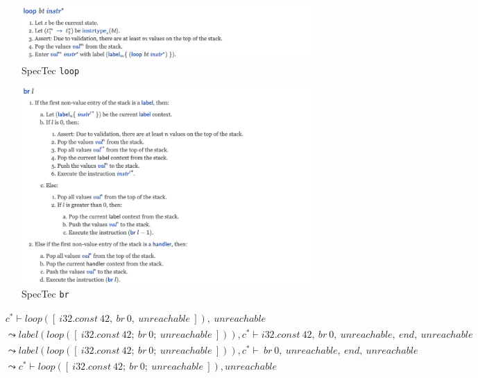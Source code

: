 \begin{figure}[h!]
    \centerline{\includegraphics[width=15cm]{fig/spectec-loop}}
    \caption[Enter the caption title here]{SpecTec \texttt{loop}} \label{fig:spectec-loop}
\end{figure}
\begin{figure}[h!]
    \centerline{\includegraphics[width=15cm]{fig/spectec-br}}
    \caption[Enter the caption title here]{SpecTec \texttt{br}} \label{fig:spectec-br}
\end{figure}

\begin{align}
  &c^*
  \vdash
  loop([ ~ i32.const ~ 42, ~ br ~ 0, ~ unreachable ~ ]), ~ unreachable
  \label{eq:loop-1} \\
&\leadsto
  label(loop([ ~ i32.const ~ 42; ~ br ~ 0; ~ unreachable ~ ])), c^*
  \vdash
  i32.const ~ 42, ~ br ~ 0, ~ unreachable, ~ end, ~ unreachable
  \label{eq:loop-2} \\
  &\leadsto
  label(loop([ ~ i32.const ~ 42; ~ br ~ 0; ~ unreachable ~ ])), c^*
  \vdash
  ~ br ~ 0, ~ unreachable, ~ end, ~ unreachable
  \label{eq:loop-3} \\
&\leadsto
  c^*
  \vdash
  loop([ ~ i32.const ~ 42; ~ br ~ 0; ~ unreachable ~ ]), unreachable
  \label{eq:loop-4}
\end{align}

